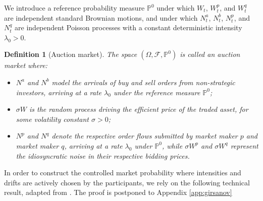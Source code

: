 \documentclass[12pt]{article}
\newtheorem{definition}[theorem2]{Definition}
\begin{document}
We introduce a reference probability measure $\mathbb{P}^{0}$ under which $W_t$, $W_t^p$, and $W_t^q$ are independent standard Brownian motions, and under which $N_t^{a}$, $N_t^{b}$, $N_t^{p}$, and $N_t^{q}$ are independent Poisson processes with a constant deterministic intensity $\lambda_0>0$. 

\begin{definition}[Auction market]
The space $(\Omega,\mathcal{F},\mathbb{P}^0)$ is called an auction market where:
\begin{itemize}
    \item $N^a$ and $N^b$ model the arrivals of buy and sell orders from non-strategic investors, arriving at a rate $\lambda_0$ under the reference measure $\mathbb{P}^0$;
    \item $\sigma W$ is the random process driving the efficient price of the traded asset, for some volatility constant $\sigma>0$;
    \item $N^p$ and $N^q$ denote the respective order flows submitted by market maker $p$ and market maker $q$, arriving at a rate $\lambda_0$ under $\mathbb{P}^0$, while $\sigma W^p$ and $\sigma W^q$ represent the idiosyncratic noise in their respective bidding prices. 
\end{itemize}
\end{definition}

In order to construct the controlled market probability where intensities and drifts are actively chosen by the participants, we rely on the following technical result, adapted from \cite[Theorems 5.3 and 5.4]{bjork2021point}. The proof is postponed to Appendix \ref{app:girsanov} 
\end{document}
